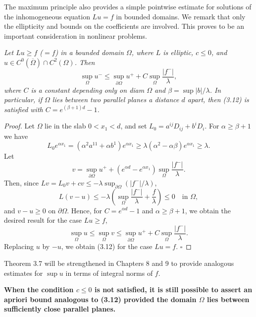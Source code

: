 The maximum principle also provides a simple pointwise estimate for solutions of the inhomogeneous equation $Lu=f$ in bounded domains. We remark that only the ellipticity and bounds on the coefficients are involved. This proves to be an important consideration in nonlinear problems.

\begin{theorem}\label{gt-ch3-apriori}
\textit{Let $Lu\ge f$ ($=f$) in a bounded domain $\Omega$, where $L$ is elliptic, $c\le 0$, and $u\in C^0(\overline{\Omega})\cap C^2(\Omega)$. Then}
\begin{equation}
\tag{3.12}
\sup_{\Omega} u^-\le \sup_{\partial\Omega} u^+ + C \sup_{\Omega}\frac{|f^-|}{\lambda},
\end{equation}
\noindent\textit{where $C$ is a constant depending only on diam $\Omega$ and $\beta=\sup |b|/\lambda$. In particular, if $\Omega$ lies between two parallel planes a distance $d$ apart, then (3.12) is satisfied with $C=e^{(\beta+1)d}-1$.}
\end{theorem}

\begin{proof}
Let $\Omega$ lie in the slab $0<x_1<d$, and set $L_0=a^{ij}D_{ij}+b^iD_i$. For $\alpha\ge \beta+1$ we have
\[
L_0e^{\alpha x_1}=(\alpha^2a^{11}+\alpha b^1)e^{\alpha x_1}\ge \lambda(\alpha^2-\alpha\beta)e^{\alpha x_1}\ge \lambda.
\]
Let
\[
v=\sup_{\partial\Omega}u^+ + (e^{\alpha d}-e^{\alpha x_1})\sup_{\Omega}\frac{|f^-|}{\lambda}.
\]
Then, since $Lv=L_0v+cv\le -\lambda\sup_{\partial\Omega}(|f^-|/\lambda)$,
\[
L(v-u)\le -\lambda\left(\sup_{\Omega}\frac{|f^-|}{\lambda}+\frac{f}{\lambda}\right)\le 0 \quad \text{in }\Omega,
\]
and $v-u\ge 0$ on $\partial\Omega$. Hence, for $C=e^{\alpha d}-1$ and $\alpha\ge \beta+1$, we obtain the desired result for the case $Lu\ge f$,
\[
\sup_{\Omega}u\le \sup_{\Omega}v\le \sup_{\partial\Omega}u^+ + C\sup_{\Omega}\frac{|f^-|}{\lambda}.
\]
Replacing $u$ by $-u$, we obtain (3.12) for the case $Lu=f$. $\square$
\end{proof}

Theorem 3.7 will be strengthened in Chapters 8 and 9 to provide analogous estimates for $\sup u$ in terms of integral norms of $f$.

\noindent \textbf{When the condition $c\le 0$ is not satisfied, it is still possible to assert an apriori bound analogous to (3.12) provided the domain $\Omega$ lies between sufficiently close parallel planes.}


